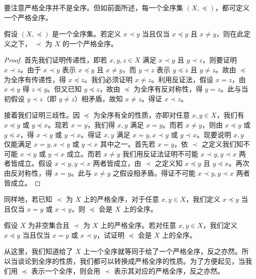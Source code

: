 要注意严格全序并不是全序。但如前面所述，每一个全序集 $(X, \preceq)$，都可定义一个严格全序。

\begin{proposition}
假设 $(X, \preceq)$ 是一个全序集。若定义 $x \prec y$ 当且仅当 $x \preceq y$ 且 $x \neq y$，则在此定义之下， $\prec$ 为 $X$ 的一个严格全序。
\end{proposition}

\begin{proof}
首先我们证明传递性，即若 $x, y, z \in X$ 满足 $x \prec y$ 且 $y \prec z$，则要证明 $x \prec z$。由于 $x \prec y$ 表示 $x \preceq y$ 且 $x \neq y$，而 $y \prec z$ 表示 $y \preceq z$ 且 $y \neq z$。故由 $\preceq$ 为全序有传递性，得 $x \preceq z$。我们必须证明 $x \neq z$。利用反证法，假设 $x = z$，由 $x \preceq y$ 得 $z \preceq y$。但又已知 $y \preceq z$，故由 $\preceq$ 为全序有反对称性，得 $y = z$。此与当初假设 $y \prec z$（即 $y \neq z$）相矛盾，故知 $x \neq z$。得证 $x \prec z$。

接着我们证明三歧性。因 $\preceq$ 为全序有全的性质，亦即对任意 $x, y \in X$，我们有 $x \preceq y$ 或 $y \preceq x$。现若 $x = y$，我们得 $x, y$ 满足 $x = y$。而若 $x \neq y$，则由 $x \preceq y$ 或 $y \preceq x$，得 $x \prec y$ 或 $y \prec x$。得证 $x, y$ 满足 $x = y, x \prec y$ 或 $y \prec x$。现要说明 $x, y$ 仅能满足 $x = y, x \prec y$ 或 $y \prec x$ 其中之一。首先若 $x = y$，依 $\prec$ 之定义我们知不可能 $x \prec y$ 或 $y \prec x$ 成立。而若 $x \neq y$ 我们用反证法证明不可能 $x \prec y, y \prec x$ 两者皆成立。假设 $x \prec y, y \prec x$ 两者皆成立，由 $\prec$ 之定义知 $x \preceq y$ 且 $y \preceq x$。再次由反对称性，得 $x = y$。此与 $x \neq y$ 之假设相矛盾。得证不可能 $x \prec y, y \prec x$ 两者皆成立。
\end{proof}

同样地，若已知 $\prec$ 为 $X$ 上的严格全序，对于任意 $x, y \in X$，我们定义 $x \preceq y$ 当且仅当 $x = y$ 或 $x \prec y$，则 $\preceq$ 会是 $X$ 上的全序。

\begin{question}
假设 $X$ 为非空集合且 $\prec$ 为 $X$ 上的严格全序。若对任意 $x, y \in X$，我们定义 $x \preceq y$ 当且仅当 $x = y$ 或 $x \prec y$，试证明 $\preceq$ 会是 $X$ 上的全序。
\end{question}

从这里，我们知道给了 $X$ 上一个全序就等同于给了一个严格全序，反之亦然。所以当谈论到全序的性质，我们都可以转换成严格全序的性质。为了方便起见，当我们用 $\preceq$ 表示一个全序，则会用 $\prec$ 表示其对应的严格全序，反之亦然。

